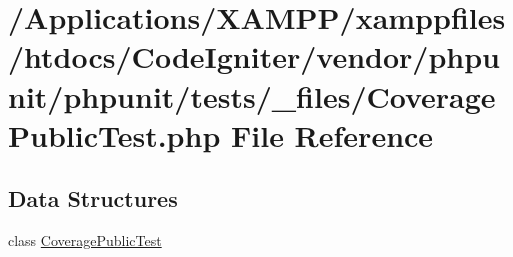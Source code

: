\hypertarget{phpunit_2tests_2__files_2_coverage_public_test_8php}{}\section{/\+Applications/\+X\+A\+M\+P\+P/xamppfiles/htdocs/\+Code\+Igniter/vendor/phpunit/phpunit/tests/\+\_\+files/\+Coverage\+Public\+Test.php File Reference}
\label{phpunit_2tests_2__files_2_coverage_public_test_8php}
\subsection*{Data Structures}
\begin{DoxyCompactItemize}
\item 
class \mbox{\hyperlink{class_coverage_public_test}{Coverage\+Public\+Test}}
\end{DoxyCompactItemize}
